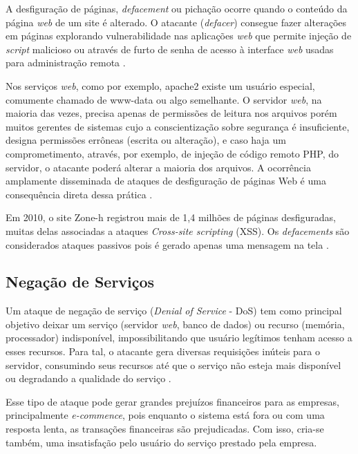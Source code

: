  A desfiguração de páginas, \textit{defacement} ou pichação ocorre quando o conteúdo da página \textit{web} de um site é alterado. O atacante (\textit{defacer}) consegue fazer alterações em páginas explorando vulnerabilidade nas aplicações \textit{web} que permite injeção de \textit{script} malicioso ou através de furto de senha de acesso à interface \textit{web} usadas para administração remota \cite{certs-ataques}.

 Nos serviços \textit{web}, como por exemplo, apache2 existe um usuário especial, comumente chamado de www-data ou algo semelhante. O servidor \textit{web}, na maioria das vezes, precisa apenas de permissões de leitura nos arquivos porém muitos gerentes de sistemas cujo a conscientização sobre segurança é insuficiente, designa permissões errôneas (escrita ou alteração), e caso haja um comprometimento, através, por exemplo, de injeção de código remoto PHP, do servidor, o atacante poderá alterar a maioria dos arquivos. A ocorrência amplamente disseminada de ataques de desfiguração de páginas Web é uma consequência direta dessa prática \cite{seguranca:william-lawrie}.

 Em 2010, o site Zone-h registrou mais de 1,4 milhões de páginas desfiguradas, muitas delas associadas a ataques \textit{Cross-site scripting} (XSS). Os \textit{defacements} são considerados ataques passivos pois é gerado apenas uma mensagem na tela \cite{angelo-xss}.

 \subsection{Negação de Serviços} \label{sec:negação}
 
 Um ataque de negação de serviço (\textit{Denial of Service} - DoS) tem como principal objetivo deixar um serviço (servidor \textit{web}, banco de dados) ou recurso (memória, processador)  indisponível, impossibilitando que usuário legítimos tenham acesso a esses recursos. Para tal, o atacante gera diversas requisições inúteis para o servidor, consumindo seus recursos até que o serviço não esteja mais disponível ou degradando a qualidade do serviço \cite{cryptsec}.

Esse tipo de ataque pode gerar grandes prejuízos financeiros para as empresas, principalmente \textit{e-commence}, pois enquanto o sistema está fora ou com uma resposta lenta, as transações financeiras são prejudicadas. Com isso, cria-se também, uma insatisfação pelo usuário do serviço prestado pela empresa.

